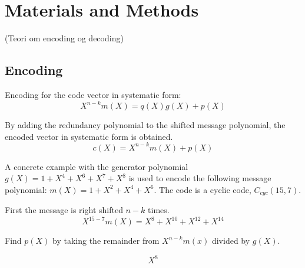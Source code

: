 \documentclass[Main]{subfiles}
\begin{document}
\section{Materials and Methods}

(Teori om encoding og decoding)
\subsection{Encoding}

\noindent Encoding for the code vector in systematic form:
\begin{equation}
X^{n-k}m(X) = q(X)g(X)+p(X)
\end{equation}

\noindent By adding the redundancy polynomial to the shifted message polynomial, the encoded vector in systematic form is obtained.
\begin{equation}
c(X) = X^{n-k}m(X)+p(X)
\end{equation}

\noindent A concrete example with the generator polynomial $g(X)=1+X^4+X^6+X^7+X^8$ is used to encode the following message polynomial:
$m(X)=1+X^2+X^4+X^6$. The code is a cyclic code, $C_{cyc}(15,7)$.

\noindent First the message is right shifted $n-k$ times.
\begin{equation}
X^{15-7}m(X) = X^8+X^{10}+X^{12}+X^{14}
\end{equation}

\noindent Find $p(X)$ by taking the remainder from $X^{n-k}m(x)$ divided by $g(X)$.

\begin{equation}
X^8
\end{equation}
\end{document}
